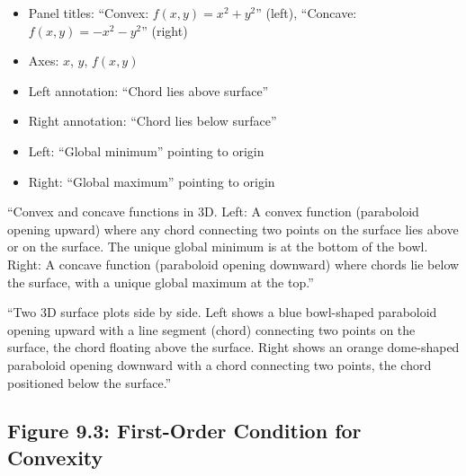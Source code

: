 \documentclass[12pt]{article}
\begin{document}
\begin{description}[style=nextline, leftmargin=0pt]
    \item[Required Labels]
    \begin{itemize}
        \item Panel titles: ``Convex: $f(x,y) = x^2 + y^2$'' (left), ``Concave: $f(x,y) = -x^2 - y^2$'' (right)
        \item Axes: $x$, $y$, $f(x,y)$
        \item Left annotation: ``Chord lies above surface''
        \item Right annotation: ``Chord lies below surface''
        \item Left: ``Global minimum'' pointing to origin
        \item Right: ``Global maximum'' pointing to origin
    \end{itemize}

    \item[Caption Text]
    ``Convex and concave functions in 3D. Left: A convex function (paraboloid opening upward) where any chord connecting two points on the surface lies above or on the surface. The unique global minimum is at the bottom of the bowl. Right: A concave function (paraboloid opening downward) where chords lie below the surface, with a unique global maximum at the top.''

    \item[Alt-Text for Accessibility]
    ``Two 3D surface plots side by side. Left shows a blue bowl-shaped paraboloid opening upward with a line segment (chord) connecting two points on the surface, the chord floating above the surface. Right shows an orange dome-shaped paraboloid opening downward with a chord connecting two points, the chord positioned below the surface.''
\end{description}

\newpage

\subsection{Figure 9.3: First-Order Condition for Convexity}
\end{document}
